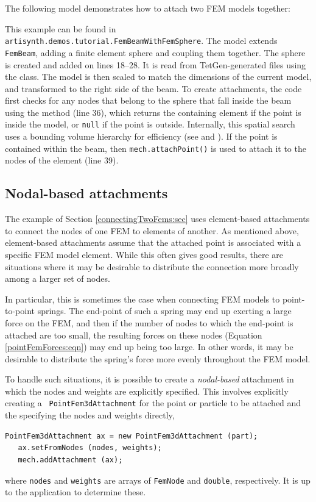 The following model demonstrates how to attach two FEM models together:
\lstset{numbers=left}

\lstset{numbers=none}
This example can be found in 
{\tt artisynth.demos.tutorial.FemBeamWithFemSphere}.  The model extends 
{\tt FemBeam}, adding a finite element sphere and coupling them together.
The sphere is created and added on lines 18--28.  It is read from
TetGen-generated files using the 
 class.  The model is then
scaled to match the dimensions of the current model, and transformed to the
right side of the beam.  To create attachments, the code first checks for 
any nodes that belong to the sphere that fall inside the beam using the
method (line 36), which returns the containing element if the point is inside
the model, or {\tt null} if the point is outside.  Internally, this spatial 
search uses a bounding volume hierarchy for efficiency (see 
 and 
).  If the point is contained
within the beam, then {\tt mech.attachPoint()}
is used to attach it to the nodes of the element (line 39).

\subsection{Nodal-based attachments}
\label{sec:fem:nodalAttachments}

The example of Section \ref{connectingTwoFems:sec} uses element-based
attachments to connect the nodes of one FEM to elements of another.
As mentioned above, element-based attachments assume that the attached
point is associated with a specific FEM model element. 
While this often gives good results, there are situations where it may
be desirable to distribute the connection more broadly among a larger
set of nodes. 

In particular, this is sometimes the case when connecting FEM models
to point-to-point springs. The end-point of such a spring may end up
exerting a large force on the FEM, and then if the number of nodes to
which the end-point is attached are too small, the resulting forces on
these nodes (Equation \ref{pointFemForces:eqn}) may end up being too
large. In other words, it may be desirable to distribute the spring's
force more evenly throughout the FEM model. 

To handle such situations, it is possible to create a {\it
nodal-based} attachment in which the nodes and weights are explicitly
specified. This involves explicitly creating a {\tt
PointFem3dAttachment} for the point or particle to be attached and the
specifying the nodes and weights directly,
%
\begin{lstlisting}[]
   PointFem3dAttachment ax = new PointFem3dAttachment (part);
   ax.setFromNodes (nodes, weights);
   mech.addAttachment (ax);
\end{lstlisting}
%
where {\tt nodes} and {\tt weights} are arrays of {\tt FemNode} and
{\tt double}, respectively. It is up to the application to determine
these.

